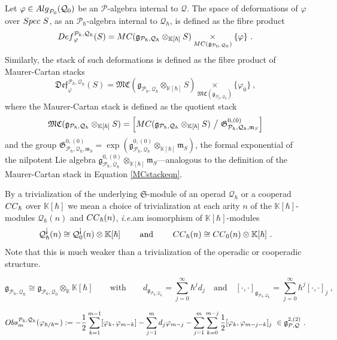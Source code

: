 \documentclass[10pt,a4paper]{amsart}
\newcommand{\ie}{i.e.\ }
\def \ie{{\it i.e.}}
\def\QQ{{\mc Q}}
\newcommand{\Alg}{{\textup{Alg}}}
\newcommand{\CC}{{\textup{CC}}}
\newcommand{\Def}{{\textup{Def}}}
\newcommand{\K}{{\bb K}}
\newcommand{\MC}{{{\textup{MC}}}}
\newcommand{\Obs}{{\textup{Obs}}}
\newcommand{\Ph}{{\mathcal{P}_\hbar}}
\newcommand{\Qh}{{\mathcal{Q}_\hbar}}
\newcommand{\Spec}{{\textup{Spec\ }}}
\newcommand{\Ss}{{{\mf{S}}}}
\newcommand{\ash}{{\textup{\mbox{!`}}}}
\newcommand{\bb}{\mathbb}
\newcommand{\fDef}{{\mathfrak{Def}}}
\newcommand{\fMC}{{{\mathfrak{MC}}}}
\newcommand{\fibre}[1]{\underset{#1}{\times}}
\newcommand{\gPQh}{{\mathfrak{g}_{\mc P_\hbar,\mc Q_\hbar}}}
\newcommand{\g}{{\mf{g}}}
\newcommand{\ik}{{\bb K}}
\newcommand{\mc}{\mathcal}
\newcommand{\mf}{\mathfrak}
\begin{document}
\begin{defn}\label{Defhbardefn} 
Let $\varphi\in \Alg_{\mc P_0}(\mc Q_0)$ be an $\mc P$-algebra internal to $\mc Q$. The space of deformations of $\varphi$ over $\Spec S$, as an $\mc P_\hbar$-algebra internal to $\mc Q_\hbar$, is defined as the fibre product
\[ 
\Def_\varphi^{\Ph,\Qh}(S) = \MC(\gPQh\otimes_{\K[\hbar]} S) \fibre{\MC(\g_{\mc P_0,\mc Q_0})} \{\varphi\} \ .  
\]
Similarly, the stack of such deformations is defined as the fibre product of Maurer-Cartan stacks
\[
\fDef_{\varphi}^{\Ph,\Qh}(S) = \fMC(\gPQh\otimes_{\K[\hbar]} S) \fibre{\fMC(\g_{\mc P_0,\mc Q_0})} \{\varphi_0\} \ , 
\]
where the Maurer-Cartan stack is defined as the quotient stack
\[ 
\fMC(\g_{\Ph,\Qh }\otimes_{\K[\hbar]} S)= \left[ \MC(\g_{\Ph,\Qh }\otimes_{\K[\hbar]} S)\  \big/\  \mf G^{0,(0)}_{\Ph,\Qh,\mf m_S} \right]  
\]
and the group $\mf G^{0,(0)}_{\Ph,\Qh,\mf m_S}=\exp(\g^{0,(0)}_{\Ph,\Qh}\otimes_{\K[\hbar]} \mf m_S)$, the formal exponential of the nilpotent Lie algebra $\g^{0,(0)}_{\Ph,\Qh}\otimes_{\K[\hbar]} \mf m_S$---analogous to the definition of the Maurer-Cartan stack in Equation \ref{MCstackeqn}.
\end{defn}

\begin{defn}\label{Ssmodtrivdefn} 
By a trivialization of the underlying $\Ss$-module of an operad $\QQ_\hbar$ or a cooperad $\CC_\hbar$ over $\ik[\hbar]$ we mean a choice of trivialization at each arity $n$ of the $\ik[\hbar]$-modules $\QQ_\hbar(n)$ and $\CC_\hbar(n)$, \ie am isomorphism of $\ik[\hbar]$-modules
\[
\QQ_{\hbar}^\ash(n) \cong \QQ_0^\ash(n) \otimes \ik[\hbar] \qquad \text{ and } \qquad \CC_\hbar(n) \cong \CC_0(n) \otimes \ik[\hbar]~.
\]
Note that this is much weaker than a trivialization of the operadic or cooperadic structure.
\end{defn}

\begin{equation}\label{gtriveqn}
	 \gPQh \cong \g_{\mc P_0,\mc Q_0}\otimes_{\K} \K[\hbar] \qquad\text{with}\qquad d_{\gPQh}= \sum_{j=0}^\infty \hbar^j d_j \quad \text{and} \quad [\cdot ,\cdot]_\gPQh = \sum_{j=0}^\infty \hbar^j[\cdot,\cdot]_j \ ,
\end{equation}

\begin{equation}\label{Obshbareqn}
	 \Obs_m^{\Ph,\Qh}(\varphi_{\hbar/\hbar^{m}}):=-\frac{1}{2} \sum_{k=1}^{m-1}[ \varphi_k,\varphi_{m-k} ] -  \sum_{j=1}^m d_j \varphi_{m-j} - \sum_{j=1}^m \sum_{k=0}^{m-j} \frac{1}{2}[\varphi_k, \varphi_{m-j-k}]_j  \ \in \g^{2,(2)}_{\mc P,\mc Q} \ .
\end{equation}
\end{document}
